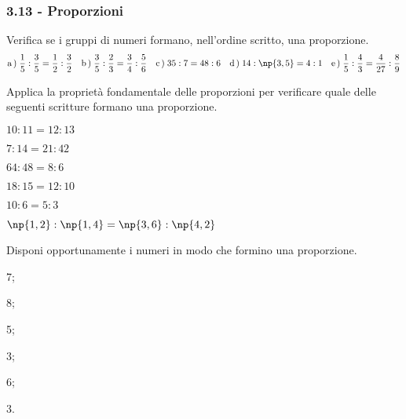 \subsubsection*{3.13 - Proporzioni}

\begin{esercizio}
 \label{ese:3.118}
Verifica se i gruppi di numeri formano, nell'ordine scritto, una proporzione.
\[
\text{a}\,\text{)}\;\frac{1}{5}:\frac{3}{5}=\frac{1}{2}:\frac{3}{2}\quad
\text{b}\,\text{)}\;\frac{3}{5}:\frac{2}{3}=\frac{3}{4}:\frac{5}{6}\quad
\text{c}\,\text{)}\;35:7=48:6\quad
\text{d}\,\text{)}\;14:\np{3,5}=4:1\quad
\text{e}\,\text{)}\;\frac{1}{5}:\frac{4}{3}=\frac{4}{27}:\frac{8}{9}
\]
\end{esercizio}
\pagebreak
\begin{esercizio}
 \label{ese:3.119}
 Applica la proprietà fondamentale delle proporzioni per verificare quale delle seguenti
scritture formano una proporzione.
\begin{multicols}{2}
 \TabPositions{4cm}
 \begin{enumeratea}
 \item $10:11=12:13$ \tab\quad\boxSi\quad\boxNo
 \item $7:14=21:42$ \tab\quad\boxSi\quad\boxNo
 \item $64:48=8:6$ \tab\quad\boxSi\quad\boxNo
 \item $18:15=12:10$ \tab\quad\boxSi\quad\boxNo
 \item $10:6=5:3$ \tab\quad\boxSi\quad\boxNo
 \item $\np{1,2}:\np{1,4}=\np{3,6}:\np{4,2}$ \tab\quad\boxSi\quad\boxNo
 \end{enumeratea}
 \end{multicols}
\end{esercizio}

\begin{esercizio}
 \label{ese:3.120}
Disponi opportunamente i numeri in modo che formino una proporzione.
\begin{multicols}{2}
\begin{enumeratea}
\item 7;
\item 8;
\item 5;
\item 3;
\item 6;
\item 3.
\end{enumeratea}
 \end{multicols}
\end{esercizio}

